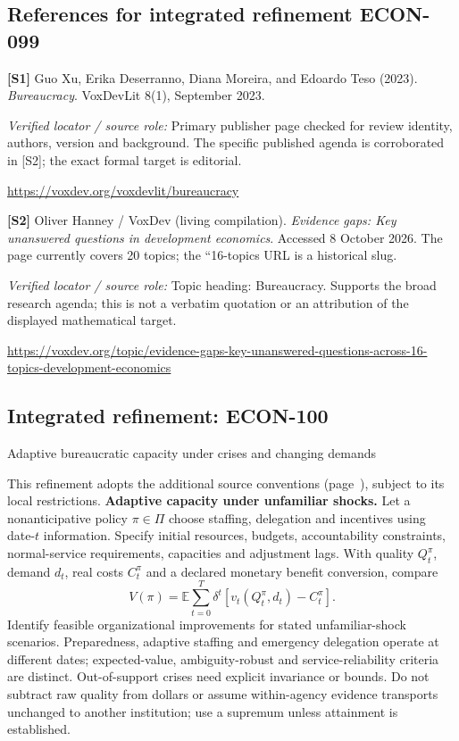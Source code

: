 \documentclass[11pt,a4paper]{article}
\begin{document}
\subsection*{References for integrated refinement ECON-099}
{\footnotesize\raggedright
\par\noindent\textbf{[S1]} Guo Xu, Erika Deserranno, Diana Moreira, and Edoardo Teso (2023). \emph{Bureaucracy}. VoxDevLit 8(1), September 2023.\par \textit{Verified locator / source role:} Primary publisher page checked for review identity, authors, version and background. The specific published agenda is corroborated in [S2]; the exact formal target is editorial.\par \url{https://voxdev.org/voxdevlit/bureaucracy}\par\smallskip
\par\noindent\textbf{[S2]} Oliver Hanney / VoxDev (living compilation). \emph{Evidence gaps: Key unanswered questions in development economics}. Accessed 8 October 2026. The page currently covers 20 topics; the ``16-topics URL is a historical slug.\par \textit{Verified locator / source role:} Topic heading: Bureaucracy. Supports the broad research agenda; this is not a verbatim quotation or an attribution of the displayed mathematical target.\par \url{https://voxdev.org/topic/evidence-gaps-key-unanswered-questions-across-16-topics-development-economics}\par\smallskip
}

\subsection*{Integrated refinement: ECON-100}
{\sffamily\small\color{muted}Adaptive bureaucratic capacity under crises and changing demands\par}
This refinement adopts the additional source conventions
(page~\pageref{audited:conventions}), subject to its local restrictions.
\textbf{Adaptive capacity under unfamiliar shocks.}
Let a nonanticipative policy $\pi\in\Pi$ choose staffing, delegation and
incentives using date-$t$ information. Specify initial resources, budgets,
accountability constraints, normal-service requirements, capacities and
adjustment lags. With quality $Q_t^\pi$, demand $d_t$, real costs $C_t^\pi$ and a
declared monetary benefit conversion, compare
\[
V(\pi)=\mathbb E\sum_{t=0}^{T}\delta^t
              [v_t(Q_t^\pi,d_t)-C_t^\pi].
\]
Identify feasible organizational improvements for stated unfamiliar-shock
scenarios. Preparedness, adaptive staffing and emergency delegation operate at
different dates; expected-value, ambiguity-robust and service-reliability
criteria are distinct. Out-of-support crises need explicit invariance or bounds.
Do not subtract raw quality from dollars or assume within-agency evidence
transports unchanged to another institution; use a supremum unless attainment
is established.
\end{document}
